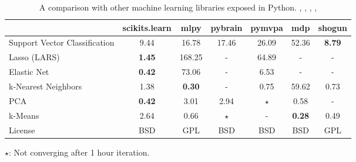 \documentclass[twoside,11pt]{article}
\begin{document}
\begin{table}[htb]
\hspace*{-.03\linewidth}%
\begin{minipage}{1.06\linewidth}
\begin{tabular}{l c c c c c c}
\hline\hline %
 & scikits.learn & mlpy & pybrain & pymvpa &  mdp & shogun \\ [0.5ex]
\hline
Support Vector Classification & 9.44 & 16.78 & 17.46 & 26.09 & 52.36 & {\bf 8.79} \\
Lasso (LARS) & {\bf 1.45} & 168.25   & -       &  64.89     & -    & - \\
Elastic Net & {\bf 0.42} & 73.06 & -  &  6.53  & -  & - \\
k-Nearest Neighbors & 1.38 & {\bf 0.30}  & - &  0.75 & 59.62    & 0.73 \\
PCA & {\bf 0.42} & 3.01  & 2.94  & $\star$ & 0.58  & - \\
k-Means  & 2.64 & 0.66 & $\star$ & -  & {\bf 0.28} & 0.49 \\
License &  BSD & GPL & BSD  &  BSD  & BSD  & GPL \\
\hline
\end{tabular}

$\star$: Not converging after 1 hour iteration.
\end{minipage}
\caption{
A comparison with other machine learning libraries exposed in Python.
\cite{hanke2009}, \cite{zito2008}, \cite{schaul2010},
\cite{sonnenburg2010}, \cite{albanese2008}
}
\end{table}





\end{document}
